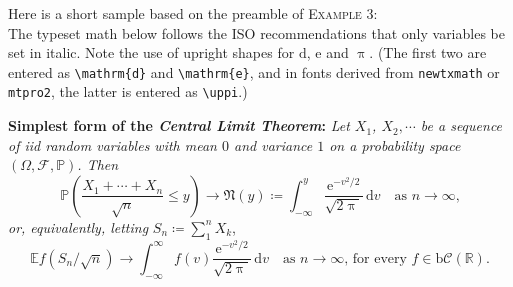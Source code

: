 \documentclass[11pt]{article}
\begin{document}
Here is a short sample based on the preamble of \textsc{Example 3}:\\[4pt]
\def\Pr{\ensuremath{\mathbb{P}}}
\def\rmd{\mathrm{d}}
The typeset math below follows the ISO recommendations that only variables
be set in italic. Note the use of upright shapes for $\rmd$, $\mathrm{e}$
and $\uppi$. (The first two are entered as \verb|\mathrm{d}| and
\verb|\mathrm{e}|, and in fonts derived from {\tt newtxmath} or {\tt mtpro2},
 the latter is entered as \verb|\uppi|.)

\textbf{Simplest form of the \textit{Central Limit Theorem}:} \textit{Let
$X_1$, $X_2,\cdots$ be a sequence of iid random variables with mean $0$ 
and variance $1$ on a probability space $(\Omega,\mathcal{F},\Pr)$. Then}
\[\Pr\left(\frac{X_1+\cdots+X_n}{\sqrt{n}}\le y\right)\to\mathfrak{N}(y)\coloneq
\int_{-\infty}^y \frac{\mathrm{e}^{-v^2/2}}{\sqrt{2\uppi}}\,
\mathrm{d}v\quad\mbox{as $n\to\infty$,}\]
\textit{or, equivalently, letting} $S_n\coloneq\sum_1^n X_k$,
\[\mathbb{E} f\left(S_n/\sqrt{n}\right)\to \int_{-\infty}^\infty f(v)
\frac{\mathrm{e}^{-v^2/2}}{\sqrt{2\uppi}}\,\mathrm{d}v
\quad\mbox{as $n\to\infty$, for every $f\in\mathrm{b}
\mathcal{C}(\mathbb{R})$.}\]

\def\testupgreek{%
  \test\Gamma \test\Delta 
  \test\Theta \test\Lambda \test\Xi \test\Pi \test\Sigma
  \test\Upsilon \test\Phi \test\Psi \test\Omega }

\def\testupgreekit{%
  \test\Gammait \test\Deltait 
  \test\Thetait \test\Lambdait \test\Xiit \test\Piit \test\Sigmait
  \test\Upsilonit \test\Phiit \test\Psiit \test\Omegait }
\def\testlowgreeki{%
  \test\alpha \test\beta \test\gamma \test\delta \test\epsilon
  \test\zeta \test\eta \test\theta \test\iota \test\kappa \test\lambda
  \test\mu }
\def\testlowgreekii{%
  \test\nu \test\xi \test o \test\pi \test\rho \test\sigma \test\tau
  \test\upsilon \test\phi \test\chi \test\psi \test\omega }
\def\testlowgreekiii{%
  \test\varepsilon \test\vartheta \test\varpi \test\varrho
  \test\varsigma \test\varphi \test\varkappa \test\ell \test\wp}
\def\testlowgreekiu{%
  \test\upalpha \test\upbeta \test\upgamma \test\updelta \test\upepsilon
  \test\upzeta \test\upeta \test\uptheta \test\upiota \test\upkappa \test\uplambda
  \test\upmu }
\def\testlowgreekiiu{%
  \test\upnu \test\upxi \test o \test\uppi \test\uprho \test\upsigma \test\uptau
  \test\upupsilon \test\upphi \test\upchi \test\uppsi \test\upomega }
\def\testlowgreekiiiu{%
  \test\upvarepsilon \test\upvartheta \test\upvarpi \test\upvarrho
  \test\upvarsigma \test\upvarphi \test\upvarkappa}
\def\testlowgreek{%
  \testlowgreeki\testlowgreekii\testlowgreekiii}
\def\testlowgreeku{%
  \testlowgreekiu\testlowgreekiiu\testlowgreekiiiu}
\def\test#1{\; #1}
\end{document}
